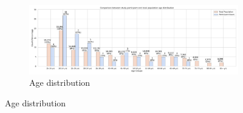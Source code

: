 \begin{figure}[h]
    \centering
    \begin{subfigure}[b]{\textwidth}
        \centering
        \includegraphics[width=\textwidth]{content/image/demo/demo_age_group_vertical.pdf}
        \caption{Age distribution}
        \label{fig:demoAge}
    \end{subfigure}
    
    \vspace{0.5cm} %


\end{figure}
